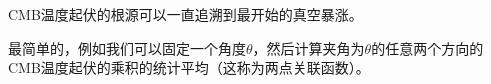 \documentclass[CJK]{beamer}
\begin{document}






\begin{frame}
\bch
CMB温度起伏的根源可以一直追溯到最开始的真空暴涨。


\skipline
最简单的，例如我们可以固定一个角度$\theta$，然后计算夹角为$\theta$的任意两个方向的CMB温度起伏的乘积的统计平均（这称为两点关联函数）。
\ech
\end{frame}
\end{document}
